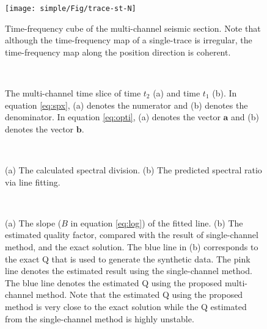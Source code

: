 \begin{figure}[htb!]
	\centering
	\texttt{[image: simple/Fig/trace-st-N]}
	\caption{Time-frequency cube of the multi-channel seismic section. Note that although the time-frequency map of a single-trace is irregular, the time-frequency map along the position direction is coherent. }
	\label{fig:trace-st-N}
\end{figure}


\begin{figure}[htb!]
	\centering
	\\
	\caption{The multi-channel time slice of time $t_2$ (a) and time $t_1$ (b). In equation \ref{eq:spx}, (a) denotes the numerator and (b) denotes the denominator. In equation \ref{eq:opti}, (a) denotes the vector $\mathbf{a}$ and (b) denotes the vector $\mathbf{b}$.}
	\label{fig:trace-f-t2-N,trace-f-t1-N}
\end{figure}


\begin{figure}[htb!]
	\centering
	\\
	\caption{(a) The calculated spectral division. (b) The predicted spectral ratio via line fitting.}
	\label{fig:trace-ratio-N,trace-lsfits}
\end{figure}


\begin{figure}[htb!]
	\centering
	\\
	\caption{(a) The slope ($B$ in equation \ref{eq:log}) of the fitted line. (b) The estimated quality factor, compared with the result of single-channel method, and the exact solution. The blue line in (b) corresponds to the exact Q that is used to generate the synthetic data. The pink line denotes the estimated result using the single-channel method.  The blue line denotes the estimated Q using the proposed multi-channel method. Note that the estimated Q using the proposed method is very close to the exact solution while the Q estimated from the single-channel method is highly unstable. }
	\label{fig:trace-coef-N,trace-comp}
\end{figure}





